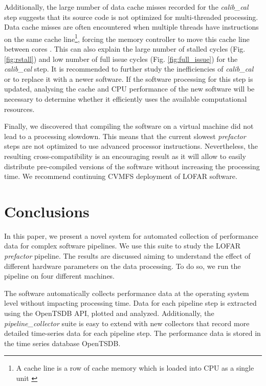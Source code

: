 Additionally, the large number of data cache misses recorded for the \textit{calib\_cal} step suggests that its source code is not optimized for multi-threaded processing. Data cache misses are often encountered when multiple threads have instructions on the same cache line\footnote{A cache line is a row of cache memory which is loaded into CPU as a single unit \citep{cache_architecture} }, forcing the memory controller to move this cache line between cores \citep{cache_misses}. This can also explain the large number of stalled cycles (Fig. \ref{fig:rstall}) and low number of full issue cycles (Fig. \ref{fig:full_issue}) for the \textit{calib\_cal} step. It is recommended to further study the inefficiencies of  \textit{calib\_cal} or to replace it with a newer software. If the software processing for this step is updated, analysing the cache and CPU performance of the new software will be necessary to determine whether it efficiently uses the available computational resources. 


Finally, we discovered that compiling the software on a virtual machine did not lead to a processing slowdown. This means that the current slowest \textit{prefactor} steps are not optimized to use advanced processor instructions. Nevertheless, the resulting cross-compatibility is an encouraging result as it will allow to easily distribute pre-compiled versions of the software without increasing the processing time. We recommend continuing CVMFS deployment of LOFAR software. 


\section{Conclusions}
 
In this paper, we present a novel system for automated collection of performance data for complex software pipelines. We use this suite to study the LOFAR \textit{prefactor} pipeline. The results are discussed aiming to understand the effect of different hardware parameters on the data processing. To do so, we run the pipeline on four different machines. 

The software automatically collects performance data at the operating system level without impacting processing time. Data for each pipeline step is extracted using the OpenTSDB API, plotted and analyzed. Additionally, the \textit{pipeline\_collector} suite is easy to extend with new collectors that record more detailed time-series data for each pipeline step. The performance data is stored in the time series database OpenTSDB.

